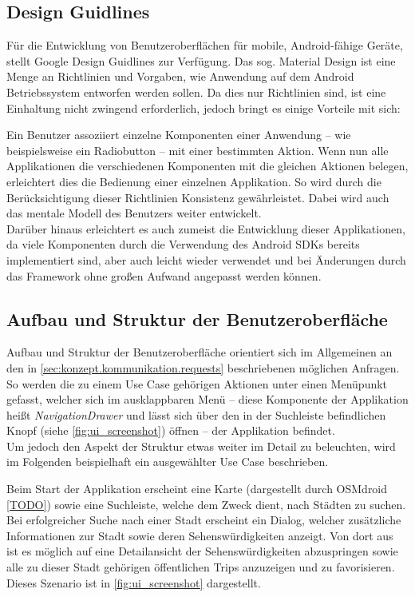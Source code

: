 		\subsection{Design Guidlines} %
		
			Für die Entwicklung von Benutzeroberflächen für mobile, Android-fähige Geräte, stellt Google Design Guidlines zur Verfügung. Das sog. Material Design \cite{Google.3182020} ist eine Menge an Richtlinien und Vorgaben, wie Anwendung auf dem Android Betriebssystem entworfen werden sollen. Da dies nur Richtlinien sind, ist eine Einhaltung nicht zwingend erforderlich, jedoch bringt es einige Vorteile mit sich:
			
			Ein Benutzer assoziiert einzelne Komponenten einer Anwendung -- wie beispielsweise ein Radiobutton -- mit einer bestimmten Aktion. Wenn nun alle Applikationen die verschiedenen Komponenten mit die gleichen Aktionen belegen, erleichtert dies die Bedienung einer einzelnen Applikation. So wird durch die Berücksichtigung dieser Richtlinien Konsistenz gewährleistet. Dabei wird auch das mentale Modell des Benutzers weiter entwickelt. \\
			Darüber hinaus erleichtert es auch zumeist die Entwicklung dieser Applikationen, da viele Komponenten durch die Verwendung des Android \acs{SDK}s bereits implementiert sind, aber auch leicht wieder verwendet und bei Änderungen durch das Framework ohne großen Aufwand angepasst werden können. \cite{SaadiaMinhas.3232020}
		
		\subsection{Aufbau und Struktur der Benutzeroberfläche} %
		
			Aufbau und Struktur der Benutzeroberfläche orientiert sich im Allgemeinen an den in \autoref{sec:konzept.kommunikation.requests} beschriebenen möglichen Anfragen. So werden die zu einem Use Case gehörigen Aktionen unter einen Menüpunkt gefasst, welcher sich im ausklappbaren Menü -- diese Komponente der Applikation heißt \textit{NavigationDrawer} und lässt sich über den in der Suchleiste befindlichen Knopf (siehe \autoref{fig:ui_screenshot}) öffnen -- der Applikation befindet. \\
			Um jedoch den Aspekt der Struktur etwas weiter im Detail zu beleuchten, wird im Folgenden beispielhaft ein ausgewählter Use Case beschrieben. 
		
			Beim Start der Applikation erscheint eine Karte (dargestellt durch OSMdroid \autoref{TODO}) sowie eine Suchleiste, welche dem Zweck dient, nach Städten zu suchen. Bei erfolgreicher Suche nach einer Stadt erscheint ein Dialog, welcher zusätzliche Informationen zur Stadt sowie deren Sehenswürdigkeiten anzeigt. Von dort aus ist es möglich auf eine Detailansicht der Sehenswürdigkeiten abzuspringen sowie alle zu dieser Stadt gehörigen öffentlichen Trips anzuzeigen und zu favorisieren. Dieses Szenario ist in \autoref{fig:ui_screenshot} dargestellt.  
			
